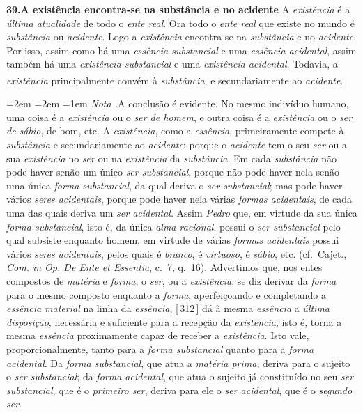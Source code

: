 \documentclass[12pt,a4paper]{article}
\newcommand{\pg}[1]{\thinspace\textup{[\,#1\,]}\thinspace}
\newcommand{\tese}[2]{\bigskip\noindent\textbf{#1.\quad #2}\;\textemdash\;}
\renewcommand\footnote[1]{%
    \stepcounter{footnote}\textsuperscript{\thefootnote}%
    \par
    {\footnotesize
     \leftskip=2em \rightskip=2em \parindent=1em
     \addvspace{\medskipamount}%
     \noindent\textit{Nota \thefootnote.}\enspace #1\par
     \addvspace{\medskipamount}}%
  }
\begin{document}
\tese{39}{A existência encontra-se na substância e no acidente} A
\emph{existência} é a \emph{última atualidade} de todo o \emph{ente real}. Ora
todo o \emph{ente real} que existe no mundo é \emph{substância} ou
\emph{acidente}. Logo a \emph{existência} encontra-se na \emph{substância} e no
\emph{acidente}. \textemdash{} Por isso, assim como há uma \emph{essência
substancial} e uma \emph{essência acidental}, assim também há uma
\emph{existência substancial} e uma \emph{existência acidental}. \textemdash{}
Todavia, a \emph{existência} principalmente convém à \emph{substância}, e
secundariamente ao \emph{acidente}.\footnote{A conclusão é evidente. No mesmo
indivíduo humano, uma coisa é a \emph{existência} ou o \emph{ser de homem}, e
outra coisa é a \emph{existência} ou o \emph{ser de sábio}, de bom, etc.
\textemdash{} A \emph{existência}, como a \emph{essência}, primeiramente compete
à \emph{substância} e secundariamente ao \emph{acidente}; porque o
\emph{acidente} tem o seu \emph{ser} ou a sua \emph{existência} no \emph{ser}
ou na \emph{existência} da \emph{substância}. \textemdash{} Em cada
\emph{substância} não pode haver senão um único \emph{ser substancial}, porque
não pode haver nela senão uma única \emph{forma substancial}, da qual deriva o
\emph{ser substancial}; mas pode haver vários \emph{seres acidentais}, porque
pode haver nela várias \emph{formas acidentais}, de cada uma das quais deriva um
\emph{ser acidental}. Assim \emph{Pedro} \textemdash{} que, em virtude da sua
única \emph{forma substancial}, isto é, da única \emph{alma racional}, possui o
\emph{ser substancial} pelo qual subsiste enquanto homem, \textemdash{} em
virtude de várias \emph{formas acidentais} possui vários \emph{seres
acidentais}, pelos quais é \emph{branco}, é \emph{virtuoso}, é \emph{sábio},
etc. (cf.\ Cajet., \emph{Com. in Op. De Ente et Essentia}, c.~7, q.~16).
\textemdash{} Advertimos que, nos entes compostos de \emph{matéria} e
\emph{forma}, o \emph{ser}, ou a \emph{existência}, se diz derivar da
\emph{forma} para o mesmo composto enquanto a \emph{forma}, aperfeiçoando e
completando a \emph{essência material} na linha da \emph{essência}, \pg{312} dá
à mesma \emph{essência} a \emph{última disposição}, necessária e suficiente para
a recepção da \emph{existência}, isto é, torna a mesma \emph{essência}
proximamente capaz de receber a \emph{existência}. Isto vale,
proporcionalmente, tanto para a \emph{forma substancial} quanto para a
\emph{forma acidental}. Da \emph{forma substancial}, que atua a \emph{matéria
prima}, deriva para o sujeito o \emph{ser substancial}; da \emph{forma
acidental}, que atua o sujeito já constituído no seu \emph{ser substancial}, que
é o \emph{primeiro ser}, deriva para ele o \emph{ser acidental}, que é o
\emph{segundo ser}.}
\end{document}
